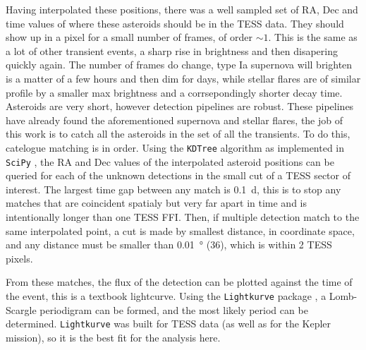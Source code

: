 \documentclass[12pt]{article}
\begin{document}
Having interpolated these positions, there was a well sampled set of RA, Dec and time values of where these asteroids should be in the TESS data.
They should show up in a pixel for a small number of frames, of order $\sim1$.
This is the same as a lot of other transient events, a sharp rise in brightness and then disapering quickly again.
The number of frames do change, type Ia supernova will brighten is a matter of a few hours and then dim for days, while stellar flares are of similar profile by a smaller max brightness and a corrsepondingly shorter decay time.
Asteroids are very short, however detection pipelines are robust.
These pipelines have already found the aforementioned supernova and stellar flares, the job of this work is to catch all the asteroids in the set of all the transients.
To do this, catelogue matching is in order.
Using the \texttt{KDTree} algorithm \citep{Maneewongvatana1999} as implemented in \texttt{SciPy} \citep{2020SciPy-NMeth} %
, the RA and Dec values of the interpolated asteroid positions can be queried for each of the unknown detections in the small cut of a TESS sector of interest. 
The largest time gap between any match is \qty{0.1}{\day}, this is to stop any matches that are coincident spatialy but very far apart in time and is intentionally longer than one TESS FFI. 
Then, if multiple detection match to the same interpolated point, a cut is made by smallest distance, in coordinate space, and any distance must be smaller than \qty{0.01}{\degree} (\qty{36}{\arcsec}), which is within 2 TESS pixels. 


From these matches, the flux of the detection can be plotted against the time of the event, this is a textbook lightcurve. Using the \texttt{Lightkurve} package \citep{Lightkurve2018}, a Lomb-Scargle periodigram can be formed, and the most likely period can be determined. \texttt{Lightkurve} was built for TESS data (as well as for the Kepler mission), so it is the best fit for the analysis here.




\end{document}
